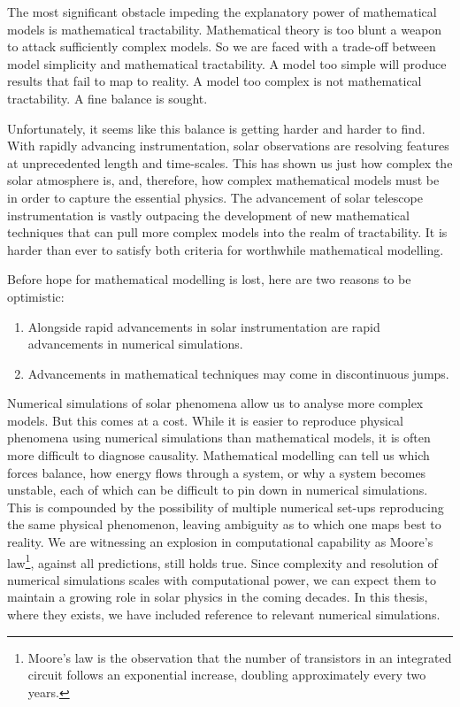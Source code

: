 The most significant obstacle impeding the explanatory power of mathematical models is mathematical tractability. Mathematical theory is too blunt a weapon to attack sufficiently complex models. So we are faced with a trade-off between model simplicity and mathematical tractability. A model too simple will produce results that fail to map to reality. A model too complex is not mathematical tractability. A fine balance is sought.

Unfortunately, it seems like this balance is getting harder and harder to find. With rapidly advancing instrumentation, solar observations are resolving features at unprecedented length and time-scales. This has shown us just how complex the solar atmosphere is, and, therefore, how complex mathematical models must be in order to capture the essential physics. The advancement of solar telescope instrumentation is vastly outpacing the development of new mathematical techniques that can pull more complex models into the realm of tractability. It is harder than ever to satisfy both criteria for worthwhile mathematical modelling.

Before hope for mathematical modelling is lost, here are two reasons to be optimistic:
\begin{enumerate}
	\item Alongside rapid advancements in solar instrumentation are rapid advancements in numerical simulations.
	\item Advancements in mathematical techniques may come in discontinuous jumps.
\end{enumerate}
Numerical simulations of solar phenomena allow us to analyse more complex models. But this comes at a cost. While it is easier to reproduce physical phenomena using numerical simulations than mathematical models, it is often more difficult to diagnose causality. Mathematical modelling can tell us which forces balance, how energy flows through a system, or why a system becomes unstable, each of which can be difficult to pin down in numerical simulations. This is compounded by the possibility of multiple numerical set-ups reproducing the same physical phenomenon, leaving ambiguity as to which one maps best to reality. We are witnessing an explosion in computational capability as Moore's law\footnote{Moore's law is the observation that the number of transistors in an integrated circuit follows an exponential increase, doubling approximately every two years.}, against all predictions, still holds true. Since complexity and resolution of numerical simulations scales with computational power, we can expect them to maintain a growing role in solar physics in the coming decades. In this thesis, where they exists, we have included reference to relevant numerical simulations.

